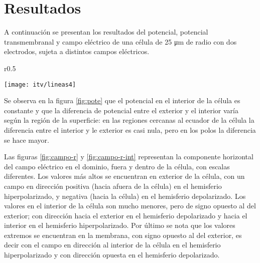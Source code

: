 
\newpage

\section{Resultados}
A continuación se presentan los resultados del potencial, potencial transmembranal y campo eléctrico de una célula de 25 \si{\micro\metre} de radio con dos electrodos, sujeta a distintos campos eléctricos.



\begin{wrapfigure}{r}{0.5\textwidth}
  \begin{center}
    \texttt{[image: itv/lineas4]}
  \end{center}
  \caption{Potencial eléctrico en el dominio para\\ E = 1600 \si{\volt\per\centi\metre}}
  \label{fig:pote}
\end{wrapfigure}

Se observa en la figura \ref{fig:pote} que el potencial en el interior de la célula es constante y que la diferencia de potencial entre el exterior y el interior varía según la región de la superficie: en las regiones cercanas al ecuador de la célula la diferencia entre el interior y le exterior es casi nula, pero en los polos la diferencia se hace mayor. 

Las figuras \ref{fig:campo-r} y \ref{fig:campo-r-int} representan la componente horizontal del campo eléctrico en el dominio, fuera y dentro de la célula, con escalas diferentes. Los valores más altos se encuentran en exterior de la célula, con un campo en dirección positiva (hacia afuera de la célula) en el hemisferio hiperpolarizado, y negativa (hacia la célula) en el hemisferio depolarizado. Los valores en el interior de la célula son mucho menores, pero de signo opuesto al del exterior; con dirección hacia el exterior en el hemisferio depolarizado y hacia el interior en el hemisferio hiperpolarizado. Por último se nota que los valores extremos se encuentran en la membrana, con signo opuesto al del exterior, es decir con el campo en dirección al interior de la célula en el hemisferio hiperpolarizado y con dirección opuesta en el hemisferio depolarizado.

